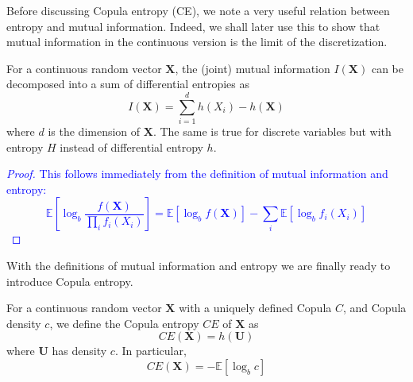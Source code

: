 \documentclass[../Thesis.tex]{subfiles}
\begin{document}
Before discussing Copula entropy (CE), we note a very useful relation between entropy and mutual information. Indeed, we shall later use this to show that mutual information in the continuous version is the limit of the discretization.
\begin{lemma}\label{lemma:mutual information and entropy relation}
    For a continuous random vector $\boldsymbol{X}$, the (joint) mutual information $I\left(\boldsymbol{X}\right)$ can be decomposed into a sum of differential entropies as
    $$I\left(\boldsymbol{X}\right) = \sum_{i=1}^{d} h(X_i) - h\left(\boldsymbol{X}\right)$$
    where $d$ is the dimension of $\boldsymbol{X}$. The same is true for discrete variables but with entropy $H$ instead of differential entropy $h$.
\end{lemma}
\textcolor{blue}{\begin{proof}
        This follows immediately from the definition of mutual information and entropy:
        $$\mathbb{E}\left[\log_b \frac{f\left(\boldsymbol X\right)}{\prod_i f_i\left(X_i\right)}\right] = \mathbb{E}\left[\log_b f\left(\boldsymbol X\right) \right] - \sum_i \mathbb{E}\left[\log_b f_i \left(X_i\right)\right]$$
    \end{proof}}
With the definitions of mutual information and entropy we are finally ready to introduce Copula entropy.
\begin{definition}\label{def:copula entropy}
    For a continuous random vector $\boldsymbol{X}$ with a uniquely defined Copula $C$, and Copula density $c$, we define the Copula entropy $CE$ of $\boldsymbol{X}$ as
    $$CE\left(\boldsymbol{X}\right) = h\left(\boldsymbol U\right)$$
    where $\boldsymbol U$ has density $c$. In particular,
    $$CE\left(\boldsymbol{X}\right) = - \mathbb{E}\left[\log_b c\right]$$
\end{definition}
\end{document}
